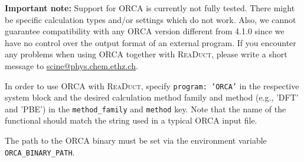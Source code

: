 \documentclass[]{tufte-book}
\begin{document}
\textbf{Important note:} Support for ORCA\cite{orca} is currently not fully tested. There might be specific calculation
types and/or settings which do not work. Also, we cannot guarantee compatibility with any ORCA version different from
4.1.0 since we have no control over the output format of an external program. If you encounter any problems when
using ORCA together with \textsc{ReaDuct}, please write a short message to \href{scine@phys.chem.ethz.ch}{scine@phys.chem.ethz.ch}.

In order to use ORCA with \textsc{ReaDuct}, specify \texttt{program: 'ORCA'} in the respective system block and the desired
calculation method family and method (e.g., 'DFT' and 'PBE') in the \texttt{method\_family} and \texttt{method} key.
Note that the name of the functional should match the string used in a typical ORCA input file.

The path to the ORCA binary must be set via the environment variable \texttt{ORCA\_BINARY\_PATH}.
\end{document}
